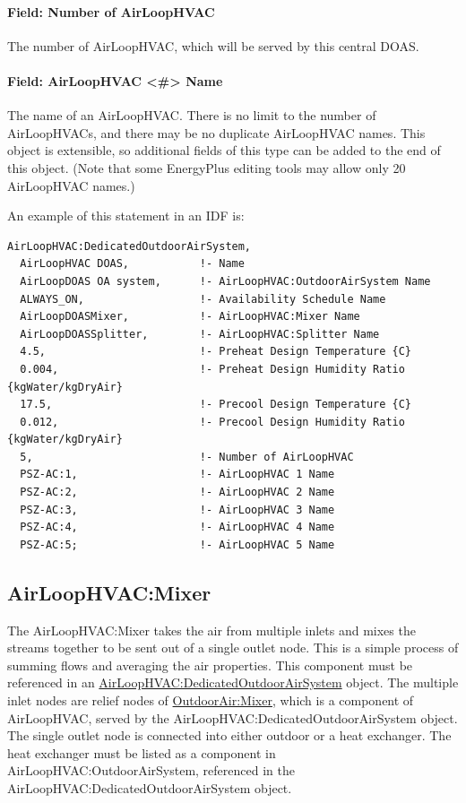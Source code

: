 \paragraph{Field: Number of AirLoopHVAC}\label{field-number-of-airloophvac}

The number of AirLoopHVAC, which will be served by this central DOAS.

\paragraph{Field: AirLoopHVAC \textless{}\#\textgreater{} Name}\label{field-airloophvac-name}

The name of an AirLoopHVAC. There is no limit to the number of AirLoopHVACs, and there may be no duplicate AirLoopHVAC names.  This object is extensible, so additional fields of this type can be added to the end of this object.  (Note that some EnergyPlus editing tools may allow only 20 AirLoopHVAC names.)

An example of this statement in an IDF is:

\begin{lstlisting}
AirLoopHVAC:DedicatedOutdoorAirSystem,
  AirLoopHVAC DOAS,           !- Name
  AirLoopDOAS OA system,      !- AirLoopHVAC:OutdoorAirSystem Name
  ALWAYS_ON,                  !- Availability Schedule Name
  AirLoopDOASMixer,           !- AirLoopHVAC:Mixer Name
  AirLoopDOASSplitter,        !- AirLoopHVAC:Splitter Name
  4.5,                        !- Preheat Design Temperature {C}
  0.004,                      !- Preheat Design Humidity Ratio {kgWater/kgDryAir}
  17.5,                       !- Precool Design Temperature {C}
  0.012,                      !- Precool Design Humidity Ratio {kgWater/kgDryAir}
  5,                          !- Number of AirLoopHVAC
  PSZ-AC:1,                   !- AirLoopHVAC 1 Name
  PSZ-AC:2,                   !- AirLoopHVAC 2 Name
  PSZ-AC:3,                   !- AirLoopHVAC 3 Name
  PSZ-AC:4,                   !- AirLoopHVAC 4 Name
  PSZ-AC:5;                   !- AirLoopHVAC 5 Name
\end{lstlisting}

\subsection{AirLoopHVAC:Mixer}\label{airloophvacmixer}

The AirLoopHVAC:Mixer takes the air from multiple inlets and mixes the streams together to be sent out of a single outlet node. This is a simple process of summing flows and averaging the air properties. This component must be referenced in an \hyperref[airloophvacdedicatedoutdoorairsystem]{AirLoopHVAC:DedicatedOutdoorAirSystem} object. The multiple inlet nodes are relief nodes of \hyperref[outdoorairmixer]{OutdoorAir:Mixer}, which is a component of AirLoopHVAC, served by the AirLoopHVAC:DedicatedOutdoorAirSystem object. The single outlet node is connected into either outdoor or a heat exchanger. The heat exchanger must be listed as a component in AirLoopHVAC:OutdoorAirSystem, referenced in the AirLoopHVAC:DedicatedOutdoorAirSystem object. 

